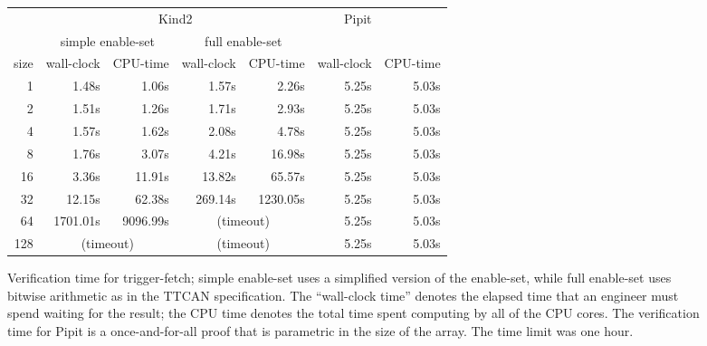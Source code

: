 \begin{figure}
  \center
\begin{tabular}{r|rr|rr|rr}
  & \multicolumn{4}{c|}{Kind2} & Pipit \\
  & \multicolumn{2}{c|}{simple enable-set} & \multicolumn{2}{c|}{full enable-set} & \\
  size & wall-clock & CPU-time & wall-clock & CPU-time & wall-clock & CPU-time \\
  \hline
  
 1 & 1.48s&1.06s
 & 1.57s&2.26s
 & 5.25s&5.03s \\
 2 & 1.51s&1.26s
 & 1.71s&2.93s
 & 5.25s&5.03s \\
 4 & 1.57s&1.62s
 & 2.08s&4.78s
 & 5.25s&5.03s \\
 8 & 1.76s&3.07s
 & 4.21s&16.98s
 & 5.25s&5.03s \\
 16 & 3.36s&11.91s
 & 13.82s&65.57s
 & 5.25s&5.03s \\
 32 & 12.15s&62.38s
 & 269.14s&1230.05s
 & 5.25s&5.03s \\
 64 & 1701.01s&9096.99s
 &  \multicolumn{2}{c|}{(timeout)}  & 5.25s&5.03s \\
 128 &  \multicolumn{2}{c|}{(timeout)}  &  \multicolumn{2}{c|}{(timeout)}  & 5.25s&5.03s \\




\end{tabular}
\caption{Verification time for trigger-fetch; simple enable-set uses a simplified version of the enable-set, while full enable-set uses bitwise arithmetic as in the TTCAN specification.
The ``wall-clock time'' denotes the elapsed time that an engineer must spend waiting for the result; the CPU time denotes the total time spent computing by all of the CPU cores.
The verification time for Pipit is a once-and-for-all proof that is parametric in the size of the array.
The time limit was one hour.}
\label{f:evaluation:kind2-runtime}
\end{figure}

